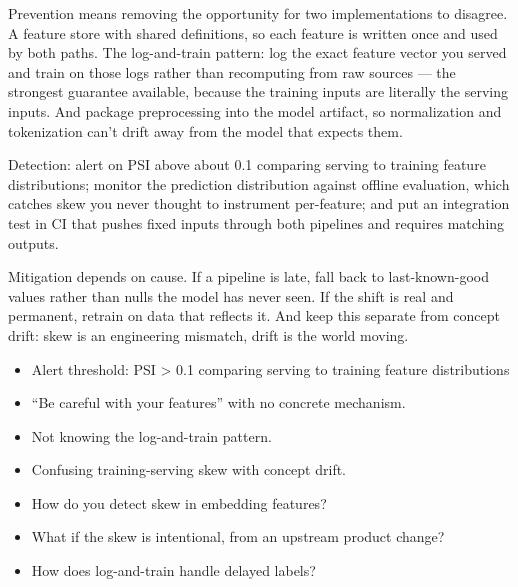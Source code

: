 \documentclass[10pt,twoside]{book}
\newcommand{\lab}[1]{\par\vspace{5pt}\noindent{\sffamily\footnotesize\bfseries\color{accent}#1}\par\vspace{1pt}}
\newcommand{\flab}[1]{\par\vspace{5pt}\noindent{\sffamily\footnotesize\bfseries\color{flag}#1}\par\vspace{1pt}}
\newcommand{\qsep}{\vspace{3pt}\noindent{\color{muted}\rule{\linewidth}{0.3pt}}}
\begin{document}
Prevention means removing the opportunity for two implementations to disagree. A feature store with shared definitions, so each feature is written once and used by both paths. The log-and-train pattern: log the exact feature vector you served and train on those logs rather than recomputing from raw sources --- the strongest guarantee available, because the training inputs are literally the serving inputs. And package preprocessing into the model artifact, so normalization and tokenization can't drift away from the model that expects them.\par\vspace{3pt}
Detection: alert on PSI above about 0.1 comparing serving to training feature distributions; monitor the prediction distribution against offline evaluation, which catches skew you never thought to instrument per-feature; and put an integration test in CI that pushes fixed inputs through both pipelines and requires matching outputs.\par\vspace{3pt}
Mitigation depends on cause. If a pipeline is late, fall back to last-known-good values rather than nulls the model has never seen. If the shift is real and permanent, retrain on data that reflects it. And keep this separate from concept drift: skew is an engineering mismatch, drift is the world moving.\par\vspace{3pt}
\lab{Numbers}
\begin{itemize}
\item Alert threshold: PSI > 0.1 comparing serving to training feature distributions
\end{itemize}
\flab{Loses the signal}
\begin{itemize}
\item ``Be careful with your features'' with no concrete mechanism.
\item Not knowing the log-and-train pattern.
\item Confusing training-serving skew with concept drift.
\end{itemize}
\lab{Then they ask}
\begin{itemize}
\item How do you detect skew in embedding features?
\item What if the skew is intentional, from an upstream product change?
\item How does log-and-train handle delayed labels?
\end{itemize}
\qsep
{}
\end{document}
